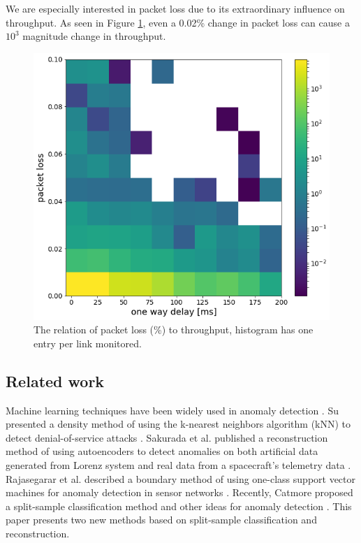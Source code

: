 \documentclass[5p]{elsarticle}
\begin{document}
We are especially interested in packet loss due to its extraordinary influence on throughput. As seen in Figure \ref{fig:PL}, even a 0.02\% change in packet loss can cause a $10^3$ magnitude change in throughput.

\begin{figure}[htbp]
    \centering
    \includegraphics[width=\linewidth]{PL.png}
    \caption{The relation of packet loss (\%) to throughput, histogram has one entry per link monitored.}
    \label{fig:PL}
\end{figure}

\subsection{Related work}

Machine learning techniques have been widely used in anomaly detection \cite{dva}. Su presented a density method of using the k-nearest neighbors algorithm (kNN) to detect denial-of-service attacks \cite{tri}. Sakurada et al. published a reconstruction method of using autoencoders to detect anomalies on both artificial data generated from Lorenz system and real data from a spacecraft’s telemetry data \cite{cetiri}. Rajasegarar et al. described a boundary method of using one-class support vector machines for anomaly detection in sensor networks \cite{pet}. Recently, Catmore proposed a split-sample classification method and other ideas for anomaly detection \cite{sest}. This paper presents two new methods based on split-sample classification and reconstruction.
\end{document}
